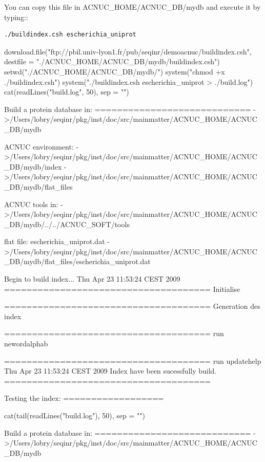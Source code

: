 \documentclass{article}
\begin{document}
\begin{itemize}
You can copy this file in ACNUC\_HOME/ACNUC\_DB/mydb and execute it by typing::

\begin{verbatim}
./buildindex.csh escherichia_uniprot
\end{verbatim}

\begin{Schunk}
\begin{Sinput}
 download.file("ftp://pbil.univ-lyon1.fr/pub/seqinr/demoacnuc/buildindex.csh", 
     destfile = "./ACNUC_HOME/ACNUC_DB/mydb/buildindex.csh")
 setwd("./ACNUC_HOME/ACNUC_DB/mydb/")
 system("chmod +x ./buildindex.csh")
 system("./buildindex.csh escherichia_uniprot >  ./build.log")
 cat(readLines("build.log", 50), sep = "\n")
\end{Sinput}
\begin{Soutput}
 Build a protein database in:
 ============================
 ->/Users/lobry/seqinr/pkg/inst/doc/src/mainmatter/ACNUC_HOME/ACNUC_DB/mydb
 
ACNUC environment:
 ->/Users/lobry/seqinr/pkg/inst/doc/src/mainmatter/ACNUC_HOME/ACNUC_DB/mydb/index
 ->/Users/lobry/seqinr/pkg/inst/doc/src/mainmatter/ACNUC_HOME/ACNUC_DB/mydb/flat_files
 
ACNUC tools in:
 ->/Users/lobry/seqinr/pkg/inst/doc/src/mainmatter/ACNUC_HOME/ACNUC_DB/mydb/../../ACNUC_SOFT/tools
 
flat file: escherichia_uniprot.dat
 ->/Users/lobry/seqinr/pkg/inst/doc/src/mainmatter/ACNUC_HOME/ACNUC_DB/mydb/flat_files/escherichia_uniprot.dat
 
Begin to build index...
Thu Apr 23 11:53:24 CEST 2009
=====================================
Initialise

=====================================
Generation des index

=====================================
run newordalphab


=====================================
run updatehelp
Thu Apr 23 11:53:24 CEST 2009
Index have been sucessfully build.
=====================================
 
Testing the index:
==================
\end{Soutput}
\begin{Sinput}
 cat(tail(readLines("build.log"), 50), sep = "\n")
\end{Sinput}
\begin{Soutput}
 Build a protein database in:
 ============================
 ->/Users/lobry/seqinr/pkg/inst/doc/src/mainmatter/ACNUC_HOME/ACNUC_DB/mydb
 

\end{Soutput}
\end{Schunk}
\end{itemize}
\end{document}
